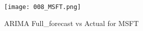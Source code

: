 \documentclass{article}
\begin{document}
\begin{figure}[h]
\centering
\texttt{[image: 008\_MSFT.png]}
\caption{ARIMA Full_forecast vs Actual for MSFT}
\label{fig:MSFT_full_forecast}
\end{figure}
\end{document}
